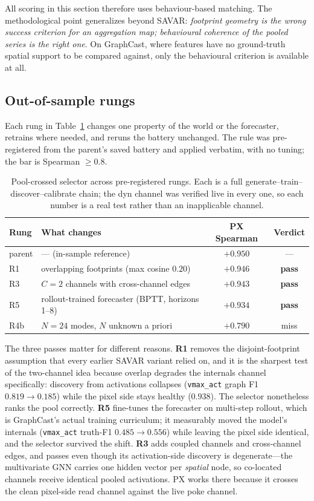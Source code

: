 All scoring in this section therefore uses behaviour-based matching. The
methodological point generalizes beyond SAVAR: \emph{footprint geometry is the
wrong success criterion for an aggregation map; behavioural coherence of the
pooled series is the right one}. On GraphCast, where features have no
ground-truth spatial support to be compared against, only the behavioural
criterion is available at all.

\subsection{Out-of-sample rungs}

Each rung in Table~\ref{tab:rungs} changes one property of the world or the
forecaster, retrains where needed, and reruns the battery unchanged. The rule was
pre-registered from the parent's saved battery and applied verbatim, with no
tuning; the bar is Spearman $\ge 0.8$.

\begin{table}[h]
\centering
\small
\begin{tabular}{llcc}
\toprule
Rung & What changes & PX Spearman & Verdict \\
\midrule
parent & --- (in-sample reference)            & $+0.950$ & --- \\
R1 & overlapping footprints (max cosine $0.20$) & $+0.946$ & \textbf{pass} \\
R3 & $C=2$ channels with cross-channel edges    & $+0.943$ & \textbf{pass} \\
R5 & rollout-trained forecaster (BPTT, horizons 1--8) & $+0.934$ & \textbf{pass} \\
R4b & $N=24$ modes, $N$ unknown a priori        & $+0.790$ & miss \\
\bottomrule
\end{tabular}
\caption{Pool-crossed selector across pre-registered rungs. Each is a full
generate--train--discover--calibrate chain; the dyn channel was verified live in
every one, so each number is a real test rather than an inapplicable channel.}
\label{tab:rungs}
\end{table}

The three passes matter for different reasons. \textbf{R1} removes the
disjoint-footprint assumption that every earlier SAVAR variant relied on, and it
is the sharpest test of the two-channel idea because overlap degrades the
internals channel specifically: discovery from activations collapses (\texttt{vmax\_act}
graph F1 $0.819 \to 0.185$) while the pixel side stays healthy ($0.938$). The
selector nonetheless ranks the pool correctly. \textbf{R5} fine-tunes the
forecaster on multi-step rollout, which is GraphCast's actual training curriculum;
it measurably moved the model's internals (\texttt{vmax\_act} truth-F1
$0.485 \to 0.556$) while leaving the pixel side identical, and the selector
survived the shift. \textbf{R3} adds coupled channels and cross-channel edges, and
passes even though its activation-side discovery is degenerate---the multivariate
GNN carries one hidden vector per \emph{spatial} node, so co-located channels
receive identical pooled activations. PX works there because it crosses the clean
pixel-side read channel against the live poke channel.

